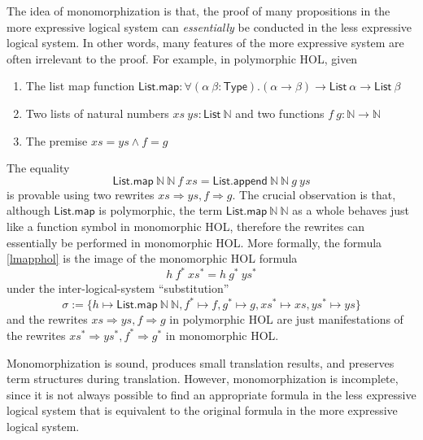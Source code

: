   The idea of monomorphization is that, the proof of many propositions in the more expressive logical
  system can \textit{essentially} be conducted in the less expressive logical system. In other words,
  many features of the more expressive system are often irrelevant to the proof. For example,
  in polymorphic HOL, given
  \begin{enumerate}
    \item The list map function $\mathsf{List.map} : \forall (\alpha \ \beta : \mathsf{Type}). (\alpha \to \beta) \to \mathsf{List} \ \alpha \to \mathsf{List} \ \beta$
    \item Two lists of natural numbers $xs \ ys : \mathsf{List} \ \mathbb{N}$ and two functions $f \ g : \mathbb{N} \to \mathbb{N}$
    \item The premise $xs = ys \land f = g$
  \end{enumerate}
  The equality
  \begin{equation}\label{lmapphol}
    \mathsf{List.map} \ \mathbb{N} \ \mathbb{N} \ f \ xs = \mathsf{List.append} \ \mathbb{N} \ \mathbb{N} \ g \ ys
  \end{equation}
  is provable using two rewrites $xs \Rightarrow ys, f \Rightarrow g$. The crucial observation is that, although $\textsf{List.map}$ is polymorphic, the term
  $\mathsf{List.map} \ \mathbb{N} \ \mathbb{N}$ as a whole behaves just like a function symbol in monomorphic HOL,
  therefore the rewrites can essentially be performed in monomorphic HOL. More formally,
  the formula \eqref{lmapphol} is the image of the monomorphic HOL formula
  $$h \ f^* \ xs^* = h \ g^* \ ys^*$$
  under the inter-logical-system ``substitution''
  $$\sigma := \{h \mapsto \mathsf{List.map} \ \mathbb{N} \ \mathbb{N},
    f^* \mapsto f, g^* \mapsto g, xs^* \mapsto xs, ys^* \mapsto ys\}$$
  and the rewrites $xs \Rightarrow ys, f \Rightarrow g$ in polymorphic HOL are just manifestations of the
  rewrites $xs^* \Rightarrow ys^*, f^* \Rightarrow g^*$ in monomorphic HOL.
  
  Monomorphization is sound, produces small translation results, and preserves
  term structures during translation. However, monomorphization is incomplete,
  since it is not always possible to find an appropriate formula in the less
  expressive logical system that is equivalent to the original formula
  in the more expressive logical system.

